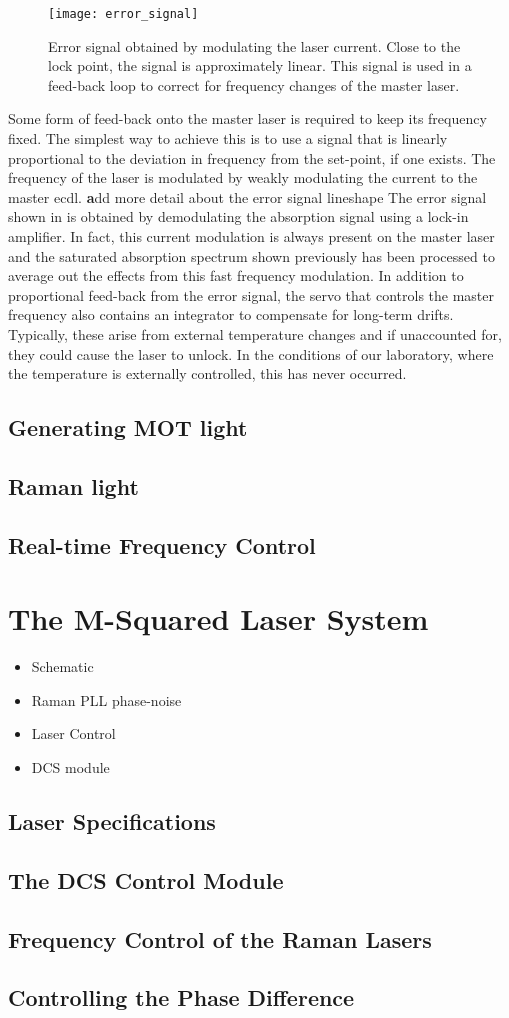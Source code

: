 \begin{figure}
    \texttt{[image: error\_signal]}
    \caption[Error Signal for the \Muquans\ master servo.]{Error signal obtained by modulating the laser current. Close to the lock point, the signal is approximately linear. This signal is used in a feed-back loop to correct for frequency changes of the master laser.}\label{fig:muquans:error_signal}
\end{figure}
Some form of feed-back onto the master laser is required to keep its frequency fixed. The simplest way to achieve this is to use a signal that is linearly proportional to the deviation in frequency from the set-point, if one exists. The frequency of the laser is modulated by weakly modulating the current to the master \ac{ecdl}. {\textbf add more detail about the error signal lineshape} The error signal shown in  is obtained by demodulating the absorption signal using a lock-in amplifier. In fact, this current modulation is always present on the master laser and the saturated absorption spectrum shown previously has been processed to average out the effects from this fast frequency modulation. In addition to proportional feed-back from the error signal, the servo that controls the master frequency also contains an integrator to compensate for long-term drifts. Typically, these arise from external temperature changes and if unaccounted for, they could cause the laser to unlock. In the conditions of our laboratory, where the temperature is externally controlled, this has never occurred.  
\subsection{Generating MOT light}
\subsection{Raman light}
\subsection{Real-time Frequency Control}
\section{The M-Squared Laser System}\label{sec:setup_msquared}
\begin{itemize}
    \item Schematic
    \item Raman PLL phase-noise
    \item Laser Control
    \item DCS module
\end{itemize}
\subsection{Laser Specifications}
\subsection{The DCS Control Module}
\subsection{Frequency Control of the Raman Lasers}
\subsection{Controlling the Phase Difference}
